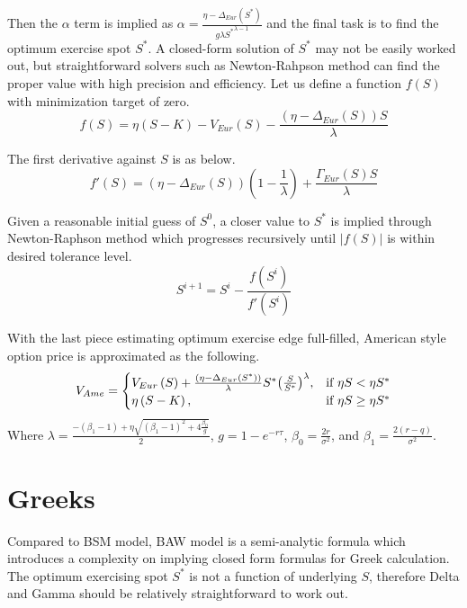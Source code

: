 \documentclass{article}
\begin{document}
Then the $ \alpha $ term is implied as $ \alpha = \frac{\eta - \Delta_{Eur}(S^*)}{g \lambda {S^*}^{\lambda - 1}} $ and the final task is to find the optimum exercise spot $ S^* $.
A closed-form solution of $ S^* $ may not be easily worked out, but straightforward solvers such as Newton-Rahpson method can find the proper value with high precision and efficiency.
Let us define a function $ f(S) $ with minimization target of zero.
\begin{equation}
    f(S) = \eta (S - K) - V_{Eur}(S) - \frac{\left(\eta - \Delta_{Eur}(S)\right)  S}{\lambda}
\end{equation}

The first derivative against $ S $ is as below.
\begin{equation}
    f'(S) = \left(\eta - \Delta_{Eur}(S)\right) \left(1 - \frac{1}{\lambda}\right) + \frac{\Gamma_{Eur}(S) S}{\lambda}
\end{equation}

Given a reasonable initial guess of $ S^0 $, a closer value to $ S^{*} $ is implied through Newton-Raphson method which progresses recursively until $ \left|f(S)\right| $ is within desired tolerance level.
\begin{equation}
    S^{i + 1} = S^i - \frac{f(S^i)}{f'(S^i)}
\end{equation}

With the last piece estimating optimum exercise edge full-filled, American style option price is approximated as the following.
\begin{equation}
    V_{Ame} = 
    \begin{cases} 
        V_{Eur}\left(S\right) + \frac{\left(\eta - \Delta_{Eur}(S^*)\right)}{\lambda} S^*  {\left(\frac{S}{S^*}\right)}^{\lambda}, & \mbox{if $ \eta S < \eta S^* $} \\
        \eta \left(S - K\right), & \mbox{if $ \eta S \geq \eta S^* $}
    \end{cases}
\end{equation}
Where $ \lambda = \frac{-\left(\beta_{1} - 1\right) + \eta \sqrt{\left(\beta_{1} - 1\right)^2 + 4 \frac{\beta_{0}}{g}}}{2} $, $ g = 1 - e^{-r \tau} $, $ \beta_{0} = \frac{2 r}{\sigma^2} $, and $ \beta_{1} = \frac{2 \left(r - q\right)}{\sigma^2} $.


\section{Greeks}

Compared to BSM model, BAW model is a semi-analytic formula which introduces a  complexity on implying closed form formulas for Greek calculation.
The optimum exercising spot $ S^* $ is not a function of underlying $ S $, therefore Delta and Gamma should be relatively straightforward to work out.
\end{document}
